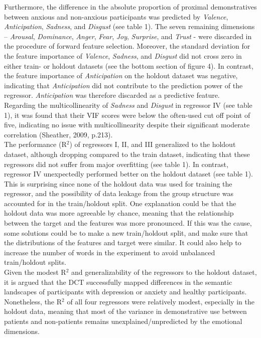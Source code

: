 \documentclass[11pt, a4paper]{article}
\begin{document}
Furthermore, the difference in the absolute proportion of proximal demonstratives between anxious and non-anxious participants was predicted by \textit{Valence}, \textit{Anticipation}, \textit{Sadness}, and \textit{Disgust} (see table 1). The seven remaining dimensions – \textit{Arousal}, \textit{Dominance}, \textit{Anger}, \textit{Fear}, \textit{Joy}, \textit{Surprise}, and \textit{Trust} - were discarded in the procedure of forward feature selection. Moreover, the standard deviation for the feature importance of \textit{Valence}, \textit{Sadness}, and \textit{Disgust} did not cross zero in either train- or holdout datasets (see the bottom section of
figure 4). In contrast, the feature importance of \textit{Anticipation} on the holdout dataset was negative, indicating that \textit{Anticipation} did not contribute to the prediction power of the regressor. \textit{Anticipation} was therefore discarded as a predictive feature. \\
Regarding the multicollinearity of \textit{Sadness} and \textit{Disgust} in regressor IV (see table 1), it was found that their VIF scores were below the often-used cut off point of five, indicating no issue with multicollinearity despite their significant moderate correlation (Sheather, 2009, p.213).\\

The performance (R$^2$) of regressors I, II, and III generalized to the holdout dataset, although dropping compared to the train dataset, indicating that these regressors did not suffer from major overfitting (see table 1). In contrast, regressor IV unexpectedly performed better on the holdout dataset (see table 1). This is surprising since none of the holdout data was used for training the regressor, and the possibility of data leakage from the group structure was accounted for in the train/holdout split. One explanation could be that the holdout data was more agreeable by chance, meaning that the relationship between the target and the features was more pronounced. If this was the cause, some solutions could be to make a new train/holdout split, and make sure that the distributions of the features and target were similar. It could also help to increase the number of words in the experiment to avoid unbalanced train/holdout splits. \\
Given the modest R$^2$ and generalizability of the regressors to the holdout dataset, it is argued that the DCT successfully mapped differences in the semantic landscapes of participants with depression or anxiety and healthy participants. Nonetheless, the R$^2$ of all four regressors were relatively modest, especially in the holdout data, meaning that most of the variance in demonstrative use between patients and non-patients remains unexplained/unpredicted by the emotional dimensions. \\
\end{document}
